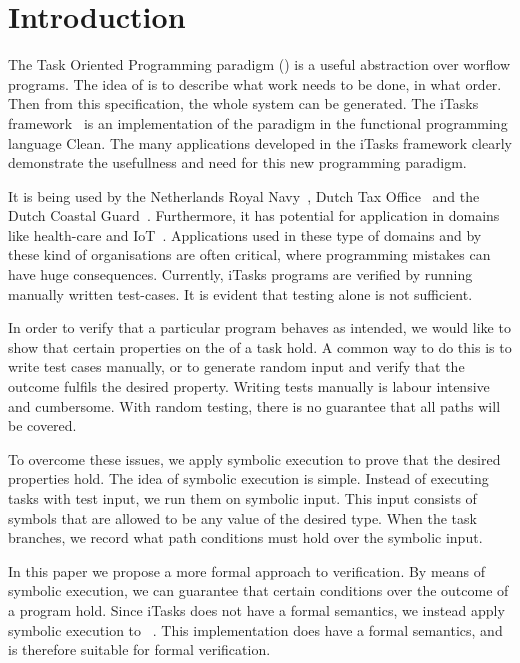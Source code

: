 


\section{Introduction}

The Task Oriented Programming paradigm (\TOP) is a useful abstraction over worflow programs.
The idea of \TOP is to describe what work needs to be done, in what order.
Then from this specification, the whole system can be generated.
The iTasks framework~\cite{DBLP:conf/ppdp/PlasmeijerLMAK12} is an implementation of the paradigm in the functional programming language Clean.
The many applications developed in the iTasks framework clearly demonstrate the usefullness and need for this new programming paradigm.

It is being used by the Netherlands Royal Navy~\cite{jansen2018dynamic}, Dutch Tax Office~\cite{conf/sfp/StutterheimAP17} and the Dutch Coastal Guard~\cite{lijnse2012incidone}. %
Furthermore, it has potential for application in domains like health-care and IoT~\cite{DBLP:conf/cgo/KoopmanLP18}.
Applications used in these type of domains and by these kind of organisations are often critical, where programming mistakes can have huge consequences.
Currently, iTasks programs are verified by running manually written test-cases. %
It is evident that testing alone is not sufficient.


In order to verify that a particular \TOPHAT program behaves as intended,
we would like to show that certain properties on the of a task hold.
A common way to do this is to write test cases manually,
or to generate random input and verify that the outcome fulfils the desired property.
Writing tests manually is labour intensive and cumbersome.
With random testing, there is no guarantee that all paths will be covered.

To overcome these issues, we apply symbolic execution to prove that the desired properties hold.
The idea of symbolic execution is simple.
Instead of executing tasks with test input, we run them on symbolic input.
This input consists of symbols that are allowed to be any value of the desired type.
When the task branches, we record what path conditions must hold over the symbolic input.

In this paper we propose a more formal approach to verification.
By means of symbolic execution, we can guarantee that certain conditions over the outcome of a \TOP program hold.
Since iTasks does not have a formal semantics, we instead apply symbolic execution to \TOPHAT~\cite{Steenvoorden2019}.
This \TOP implementation does have a formal semantics, and is therefore suitable for formal verification.

